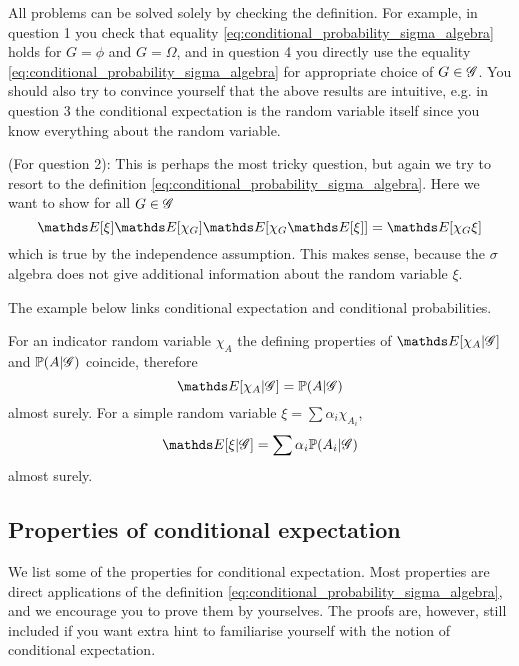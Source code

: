 \begin{hint}
All problems can be solved solely by checking the definition. For example, in question 1 you check that equality \eqref{eq:conditional_probability_sigma_algebra} holds for $G = \phi$ and $G = \Omega$, and in question 4 you directly use the equality \eqref{eq:conditional_probability_sigma_algebra} for appropriate choice of $G \in \mathcal{G}$. You should also try to convince yourself that the above results are intuitive, e.g. in question 3 the conditional expectation is the random variable itself since you know everything about the random variable.
\end{hint}

\begin{solution} (For question 2):
This is perhaps the most tricky question, but again we try to resort to the definition \eqref{eq:conditional_probability_sigma_algebra}. Here we want to show for all $G \in \mathcal{G}$
\begin{equation}
    \E[\xi] \E[\chi_G] \E[\chi_G \E[\xi]] = \E[\chi_G \xi]
\end{equation}
which is true by the independence assumption. This makes sense, because the $\sigma$ algebra does not give additional information about the random variable $\xi$.
\end{solution}

The example below links conditional expectation and conditional probabilities.

\begin{example}
For an indicator random variable $\chi_A$ the defining properties of $\E[\chi_A | \G]$ and $\mathbb{P}(A| \mathcal{G})$ coincide, therefore 
\begin{equation}
    \E[\chi_A | \G] = \p(A | \G)
\end{equation}
almost surely. For a simple random variable $\xi = \sum \alpha_i \chi_{A_i}$,
\begin{equation}
    \E[\xi | \G] = \sum \alpha_i \p(A_i | \G)
\end{equation}
almost surely.
\end{example}

\subsection{Properties of conditional expectation}
We list some of the properties for conditional expectation. Most properties are direct applications of the definition \eqref{eq:conditional_probability_sigma_algebra}, and we encourage you to prove them by yourselves. The proofs are, however, still included if you want extra hint to familiarise yourself with the notion of conditional expectation.

